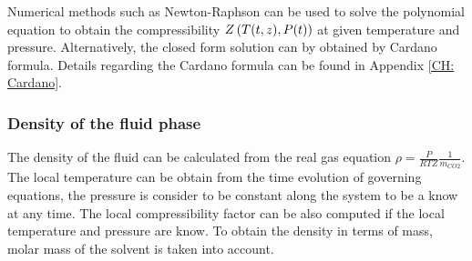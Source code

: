 \documentclass[../Article_Model_Parameters.tex]{subfiles}
\begin{document}
	Numerical methods such as Newton-Raphson can be used to solve the polynomial equation to obtain the compressibility ${\color{black}Z}\left({\color{black}T}(t,z), {\color{black}P}(t)\right)$ at given temperature and pressure. Alternatively, the closed form solution can by obtained by Cardano formula. Details regarding the Cardano formula can be found in Appendix \ref{CH: Cardano}.
	
	\subsubsection{Density of the fluid phase} \label{subsubsec: Fluid density}
	
	The density of the fluid can be calculated from the real gas equation $\rho = \frac{P}{RTZ} \frac{1}{m_{CO2}}$. The local temperature can be obtain from the time evolution of governing equations, the pressure is consider to be constant along the system to be a know at any time. The local compressibility factor can be also computed if the local temperature and pressure are know. To obtain the density in terms of mass, molar mass of the solvent is taken into account.
	
\end{document}
